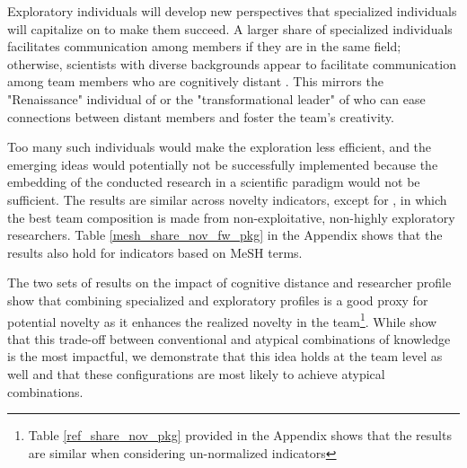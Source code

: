 Exploratory individuals will develop new perspectives that specialized individuals will capitalize on to make them succeed. A larger share of specialized individuals facilitates communication among members if they are in the same field; otherwise, scientists with diverse backgrounds appear to facilitate communication among team members who are cognitively distant \citep{page2007}. This mirrors the "Renaissance" individual of \citep{jones2009burden} or the "transformational leader" of \cite{shin2007educational} who can ease connections between distant members and foster the team's creativity.

Too many such individuals would make the exploration less efficient, and the emerging ideas would potentially not be successfully implemented because the embedding of the conducted research in a scientific paradigm would not be sufficient. The results are similar across novelty indicators, except for \cite{shibayama2021measuring}, in which the best team composition is made from non-exploitative, non-highly exploratory researchers. Table \ref{mesh_share_nov_fw_pkg} in the Appendix shows that the results also hold for indicators based on MeSH terms.

The two sets of results on the impact of cognitive distance and researcher profile show that combining specialized and exploratory profiles is a good proxy for potential novelty as it enhances the realized novelty in the team\footnote{ \justifying Table \ref{ref_share_nov_pkg} provided in the Appendix shows that the results are similar when considering un-normalized indicators}. While \cite{uzzi2013atypical} show that this trade-off between conventional and atypical combinations of knowledge is the most impactful, we demonstrate that this idea holds at the team level as well and that these configurations are most likely to achieve atypical combinations.

